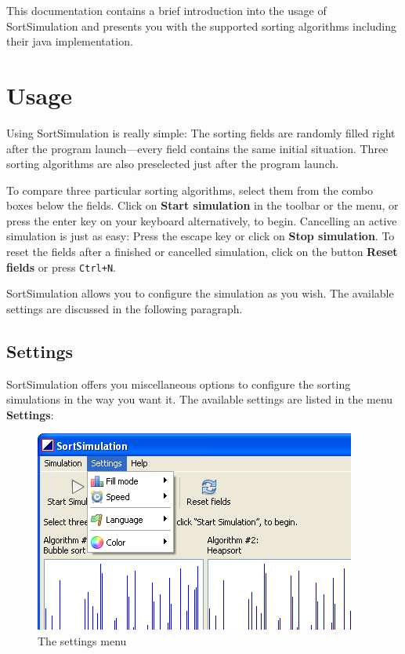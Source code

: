 \documentclass[11pt, a4paper, titlepage, twoside]{article}
\renewcommand{\emph}{\textbf}
\begin{document}
	This documentation contains a brief introduction into the usage of SortSimulation and presents you with the supported sorting algorithms including their java implementation.
	
	\section{Usage}
	
	Using SortSimulation is really simple: The sorting fields are randomly filled right after the program launch---every field contains the same initial situation. Three sorting algorithms are also preselected just after the program launch.
	
	To compare three particular sorting algorithms, select them from the combo boxes below the fields. Click on \emph{Start simulation} in the toolbar or the menu, or press the enter key on your keyboard alternatively, to begin. Cancelling an active simulation is just as easy: Press the escape key or click on \emph{Stop simulation}. To reset the fields after a finished or cancelled simulation, click on the button \emph{Reset fields} or press \texttt{Ctrl+N}.
	
	SortSimulation allows you to configure the simulation as you wish. The available settings are discussed in the following paragraph.
	
	\subsection{Settings}
	
	SortSimulation offers you miscellaneous options to configure the sorting simulations in the way you want it. The available settings are listed in the menu \emph{Settings}:
	
	\begin{figure}[h]
		\begin{center}
			\includegraphics[scale=0.6]{images/image1.png}
			\caption{The settings menu}
		\end{center}
	\end{figure}
	
\end{document}
